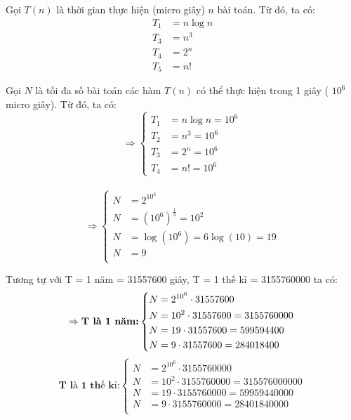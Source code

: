 \documentclass[12pt, letterpaper]{article}
\begin{document}
    \begin{minipage}{1\textwidth}
    Gọi \( T(n) \) là thời gian thực hiện (micro giây) \( n \) bài toán. Từ đó, ta có:
\[
    \begin{aligned}
        T_1 &= n \log n \\
        T_3 &= n^3 \\
        T_4 &= 2^n \\
        T_5 &= n!
    \end{aligned}
\]

Gọi \( N \) là tối đa số bài toán các hàm \( T(n) \) có thể thực hiện trong 1 giây ( \( 10^6 \) micro giây). Từ đó, ta có:
\[
\Rightarrow
\left\{
\begin{aligned}
T_1 &= n \log n = 10^6 \\
T_2 &= n^3 = 10^6 \\
T_3 &= 2^n = 10^6 \\
T_4 &= n! = 10^6
\end{aligned}
\right.
\]\\
\[
\Rightarrow
\left\{
\begin{aligned}
        N &= 2^{10^6} \\
        N &= (10^6)^{\frac{1}{3}} = 10^2 \\
        N &= \log(10^6) = 6 \log(10) = 19 \\
        N &= 9\\
\end{aligned}
\right.
\]
\end{minipage}
Tương tự với T = 1 năm = 31557600 giây, T = 1 thế kỉ = 3155760000 ta có:
\[
\Rightarrow
\textbf{T là 1 năm:}
\left\{
\begin{aligned}
        N &= 2^{10^6}\cdot31557600\\
        N &=  10^2\cdot31557600 = 3155760000 \\
        N &= 19\cdot31557600 = 599594400\\
        N &= 9\cdot31557600 = 284018400\\
\end{aligned}\\
\right.\\
\]
\[
\textbf{T là 1 thế kỉ:}
\left\{
\begin{aligned}
        N &= 2^{10^6}\cdot3155760000\\
        N &=  10^2\cdot3155760000 = 315576000000 \\
        N &= 19\cdot3155760000 = 59959440000\\
        N &= 9\cdot3155760000 = 28401840000\\
\end{aligned}
\right.
\]
\end{document}
